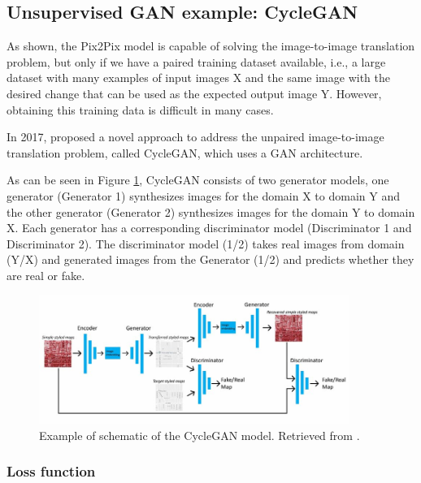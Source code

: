 \subsection{Unsupervised GAN example: CycleGAN}
\label{subsection:CycleGAN}

As shown, the Pix2Pix model is capable of solving the image-to-image translation problem, but only if we have a paired training dataset available, i.e., a large dataset with many examples of input images X and the same image with the desired change that can be used as the expected output image Y. However, obtaining this training data is difficult in many cases. 

In 2017, \citet{cycleGAN:original} proposed a novel approach to address the unpaired image-to-image translation problem, called CycleGAN, which uses a \ac{GAN} architecture. 

As can be seen in Figure \ref{fig:cyclegan}, CycleGAN consists of two generator models, one generator (Generator 1) synthesizes images for the domain X to domain Y and the other generator (Generator 2) synthesizes images for the domain Y to domain X. Each generator has a corresponding discriminator model (Discriminator 1 and Discriminator 2). The discriminator model (1/2) takes real images from domain (Y/X) and generated images from the Generator (1/2) and predicts whether they are real or fake. 

\begin{figure}[!htb]
  \centering
  \includegraphics[width=0.90\textwidth]{Images/Data-flow-of-CycleGAN-in-this-research.jpg}
  \caption[Example of schematic of the CycleGAN model.]{Example of schematic of the CycleGAN model. Retrieved from \cite{cyclegan:image}.}
  \label{fig:cyclegan}
\end{figure}

\subsubsection*{Loss function}


